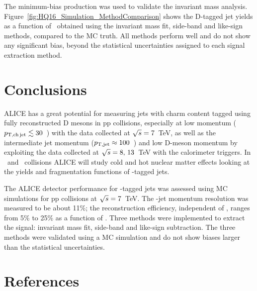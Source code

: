 \documentclass[a4paper]{jpconf}
\begin{document}
The minimum-bias production was used to validate the invariant mass analysis. 
Figure~\ref{fig:HQ16_Simulation_MethodComparison} shows the D-tagged jet yields as a function of \ptchjetdet\ obtained using the invariant mass fit, 
side-band and like-sign methods, compared to the MC truth. All methods perform well and do not show any significant bias, beyond the statistical uncertainties assigned to each signal extraction method.

\section{Conclusions}
ALICE has a great potential for measuring jets with charm content tagged using fully reconstructed D mesons in pp collisions, 
especially at low momentum ($p_{\mathrm{T,ch\, jet}} \lesssim 30$~\GeVc) with the data collected at $\sqrt{s}=7$~TeV,
as well as the intermediate jet momentum ($p_{\mathrm{T,jet}}\approx100$~\GeVc) and
low D-meson momentum by exploiting the data collected at $\sqrt{s}=8,\,13$~TeV with the calorimeter triggers.
In \PbPb\ and \pPb\ collisions ALICE will study cold and hot nuclear matter effects
looking at the yields and fragmentation functions of \Dzero-tagged jets.

The ALICE detector performance for \Dzero-tagged jets was assessed using MC simulations
for pp collisions at $\sqrt{s}=7$~TeV. The \Dzero-jet momentum resolution was measured to be about 11\%; the reconstruction efficiency, independent of \ptchjet, ranges from 5\% to 25\% as a function of \ptd.
Three methods were implemented to extract the signal: invariant mass fit, side-band and like-sign subtraction.
The three methods were validated using a MC simulation and do not show biases larger than the statistical uncertainties.

\section*{References}
{}

\end{document}
